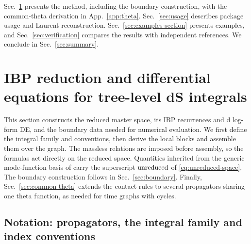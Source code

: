 \documentclass[11pt,a4paper]{article}
\numberwithin{table}{section}
\begin{document}
Sec.~\ref{sec:method} presents the method, including the boundary construction, with the
common-theta derivation in App.~\ref{app:theta}. Sec.~\ref{sec:usage} describes package usage
and Laurent reconstruction. Sec.~\ref{sec:examples-section} presents examples, and
Sec.~\ref{sec:verification} compares the results with independent references. We conclude
in Sec.~\ref{sec:summary}.

\section{IBP reduction and differential equations for tree-level dS integrals}
\label{sec:method}

This section constructs the reduced master space, its IBP recurrences and d log-form DE,
and the boundary data needed for numerical evaluation. We first define the integral family
and conventions, then derive the local blocks and assemble them over the graph. The massless
relations are imposed before assembly, so the formulas act directly on the reduced space.
Quantities inherited from the generic mode-function basis of \cite{Chen:2023iix} carry the
superscript ${\rm unreduced}$ of \eqref{eq:unreduced-space}. The boundary construction follows
in Sec.~\ref{sec:boundary}. Finally, Sec.~\ref{sec:common-theta} extends the contact rules to
several propagators sharing one theta function, as needed for time graphs with cycles.

\subsection{Notation: propagators, the integral family and index conventions}
\label{sec:notation}
\label{sec:conventions}
\end{document}
